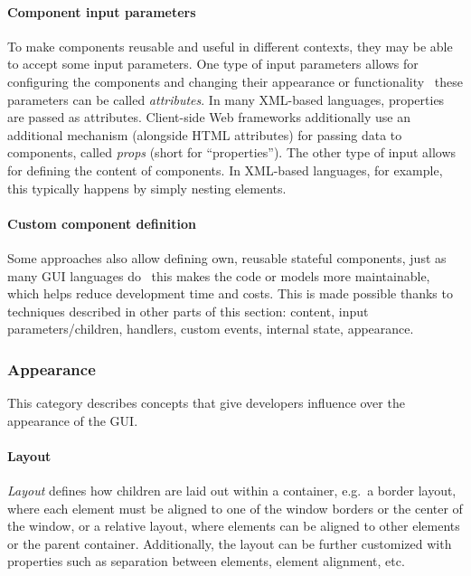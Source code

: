 \paragraph{Component input parameters}
To make components reusable and useful in different contexts, they may be able to accept some input parameters.
One type of input parameters allows for configuring the components and changing their appearance or functionality \textendash\ these parameters can be called \emph{attributes}.
In many XML-based languages, properties are passed as attributes.
Client-side Web frameworks additionally use an additional mechanism (alongside HTML attributes) for passing data to components, called \emph{props} (short for \enquote{properties}).
The other type of input allows for defining the content of components.
In XML-based languages, for example, this typically happens by simply nesting elements.

\paragraph{Custom component definition}
Some approaches also allow defining own, reusable stateful components, just as many GUI languages do \textendash\ this makes the code or models more maintainable, which helps reduce development time and costs.
This is made possible thanks to techniques described in other parts of this section: content, input parameters/children, handlers, custom events, internal state, appearance.

\subsubsection{Appearance}
This category describes concepts that give developers influence over the appearance of the GUI\@.

\paragraph{Layout}
\emph{Layout} defines how children are laid out within a container, e.g.\ a border layout, where each element must be aligned to one of the window borders or the center of the window, or a relative layout, where elements can be aligned to other elements or the parent container.
Additionally, the layout can be further customized with properties such as separation between elements, element alignment, etc.

